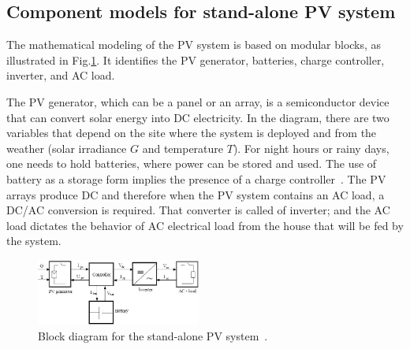 \documentclass[journal]{IEEEtran}
\begin{document}
\subsection{Component models for stand-alone PV system }

The mathematical modeling of the PV system is based on modular blocks, as illustrated in Fig.\ref{fig:blockdiagram}. It identifies the PV generator, batteries, charge controller, inverter, and AC load. 

The PV generator, which can be a panel or an array, is a semiconductor device that can convert solar energy into DC electricity. In the diagram, there are two variables that depend on the site where the system is deployed and from the weather (solar irradiance $G$ and temperature $T$). For night hours or rainy days, one needs to hold batteries, where power can be stored and used. The use of battery as a storage form implies the presence of a charge controller~\cite{Hansen,Mellit}. The PV arrays produce DC and therefore when the PV system contains an AC load, a DC/AC conversion is required. That converter is called of inverter; and the AC load dictates the behavior of AC electrical load from the house that will be fed by the system.
%
%
\begin{figure}[h]
\includegraphics[width=0.48\textwidth]{blockdiagramPVS2}
\centering
\caption{Block diagram for the stand-alone PV system~\cite{Hansen}.}
\label{fig:blockdiagram}
\end{figure}


\end{document}
